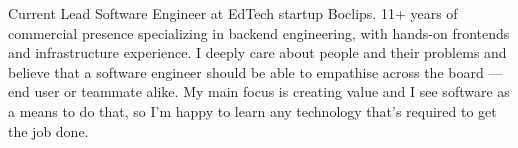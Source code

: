

\begin{cvparagraph}

Current Lead Software Engineer at EdTech startup Boclips.
11+ years of commercial presence specializing in backend engineering, with hands-on frontends and infrastructure experience.
I deeply care about people and their problems and believe that a software engineer should be able to empathise across the board — end user or teammate alike.
My main focus is creating value and I see software as a means to do that, so I'm happy to learn any technology that's required to get the job done.
\end{cvparagraph}
